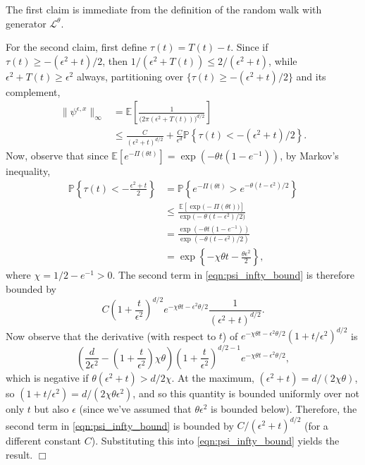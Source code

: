\documentclass[12pt]{article}
\newenvironment {proof}{{\noindent\bf Proof }}{\hfill $\Box$ \medskip}
\newcommand{\IP}{\mathbb P}
\newcommand{\IE}{\mathbb E}
\numberwithin{equation}{section}
\begin{document}
\begin{proof}
    The first claim is immediate from the definition of the random walk 
with generator $\mathcal{L}^\theta$.

For the second claim, first define $\tau(t) = T(t)-t$.
Since if $\tau(t) \ge -(\epsilon^2 + t)/2$,
then $1/(\epsilon^2 + T(t)) \le 2/(\epsilon^2 + t)$,
while $\epsilon^2 + T(t) \ge \epsilon^2$ always,
partitioning over
$\{ \tau(t) \ge -(\epsilon^2 + t)/2 \}$ and its complement,
\begin{align}
   \| \psi^{\epsilon,x} \|_\infty
    &=
        \IE\left[ 
            \frac{1}{\big(2 \pi (\epsilon^2+T(t))\big)^{d/2}}
        \right] \nonumber
    \\ & \le
        \frac{C}{(\epsilon^2 + t)^{d/2}}
        + 
        \frac{C}{\epsilon^d}
        \IP\left\{
            \tau(t) < - (\epsilon^2 + t) / 2
        \right\}. \label{eqn:psi_infty_bound}
\end{align}
Now, observe that since $\IE[e^{-\Pi(\theta t)}] = \exp(-\theta t (1 - e^{-1}))$,
by Markov's inequality,
\begin{align}
    \IP\left\{
        \tau(t) < - \frac{\epsilon^2 + t}{2}
    \right\}
    &=
    \IP\left\{
        e^{-\Pi(\theta t)} > e^{-\theta (t - \epsilon^2) / 2}
    \right\}
\nonumber
\\
&\leq \frac{\IE[\exp\big(-\Pi(\theta t)\big)]}{\exp\big(-\theta(t-\epsilon^2)/2\big)}
\nonumber
    \\&=
    \frac{
        \exp(- \theta t(1 - e^{-1}))
    }{
        \exp(- \theta (t - \epsilon^2) / 2)
    }
\nonumber
    \\&=
    \exp\left\{ - \chi \theta t - \frac{\theta \epsilon^2}{2} \right\} ,
\label{bound for negative tau}
\end{align}
where $\chi = 1/2 - e^{-1} > 0$.
The second term in \eqref{eqn:psi_infty_bound} is therefore bounded by
\[
    C \left(1 + \frac{t}{\epsilon^2}\right)^{d/2} e^{-\chi \theta t - \epsilon^2 \theta / 2}
    \frac{1}{(\epsilon^2 + t)^{d/2}} .
\]
Now observe that the derivative (with respect to $t$) of 
$e^{-\chi \theta t - \epsilon^2 \theta / 2} (1 + t/\epsilon^2)^{d/2}$ 
is
\[
    \left( \frac{d}{2 \epsilon^2} - \left(1 + \frac{t}{\epsilon^2}\right) \chi \theta \right)
    \left( 1 + \frac{t}{\epsilon^2} \right)^{d/2 - 1} e^{-\chi \theta t - \epsilon^2 \theta / 2} ,
\]
which is negative if $\theta(\epsilon^2 + t) > d/2 \chi$.
At the maximum, $(\epsilon^2 + t) = d / (2\chi \theta)$,
so $(1 + t/\epsilon^2) = d /(2\chi \theta \epsilon^2)$,
and so this quantity is bounded uniformly over not only $t$ but also $\epsilon$
(since we've assumed that $\theta \epsilon^2$ is bounded below).
Therefore, the second term in \eqref{eqn:psi_infty_bound} 
is bounded by $C / (\epsilon^2 + t)^{d/2}$
(for a different constant $C$).
Substituting this into \eqref{eqn:psi_infty_bound} yields the result.
\end{proof}
\end{document}
